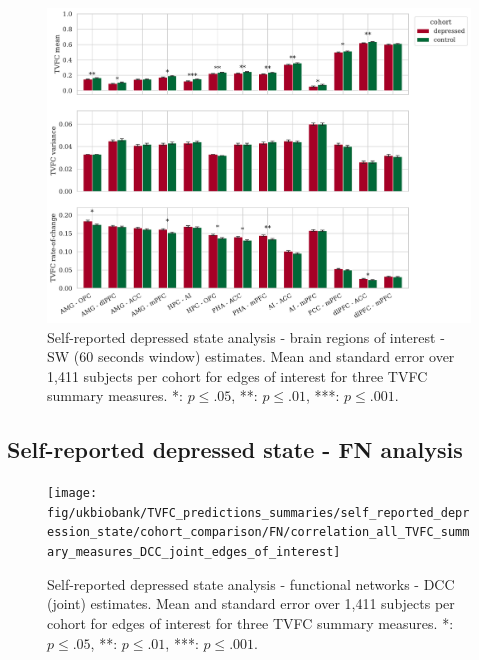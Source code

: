 \begin{figure}[h]
    \centering
    \includegraphics[width=\textwidth]{fig/ukbiobank/TVFC_predictions_summaries/self_reported_depression_state/cohort_comparison/ROI/correlation_all_TVFC_summary_measures_SW_60_edges_of_interest}
    \caption{
        Self-reported depressed state analysis - brain regions of interest - SW (60 seconds window) estimates.
        Mean and standard error over 1,411 subjects per cohort for edges of interest for three TVFC summary measures.
        *: $p \leq .05$, **: $p \leq .01$, ***: $p \leq .001$.
    }\label{fig:ukb-results-srds-roi-cohort-comparison-edges-of-interest-sw-60}
\end{figure}


\clearpage
\subsection{Self-reported depressed state - FN analysis}


\begin{figure}[h]
    \centering
    \texttt{[image: fig/ukbiobank/TVFC\_predictions\_summaries/self\_reported\_depression\_state/cohort\_comparison/FN/correlation\_all\_TVFC\_summary\_measures\_DCC\_joint\_edges\_of\_interest]}
    \caption{
        Self-reported depressed state analysis - functional networks - DCC (joint) estimates.
        Mean and standard error over 1,411 subjects per cohort for edges of interest for three TVFC summary measures.
        *: $p \leq .05$, **: $p \leq .01$, ***: $p \leq .001$.
    }\label{fig:ukb-results-srds-fn-cohort-comparison-edges-of-interest-dcc-j}
\end{figure}


